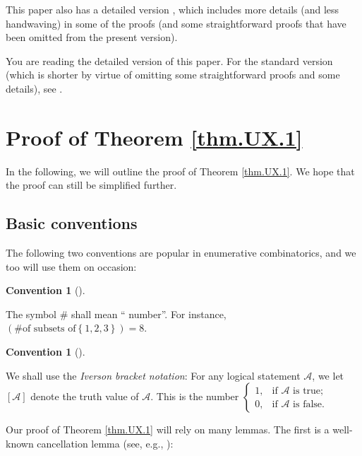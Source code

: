 \documentclass[numbers=enddot,12pt,final,onecolumn,notitlepage]{scrartcl}%
\numberwithin{exer}{section}
\theoremstyle{definition}
\newtheorem{conv}[theo]{Convention}
\newenvironment{convention}[1][]
{\begin{conv}[#1]\begin{leftbar}}
{\end{leftbar}\end{conv}}
\newenvironment{verlong}{}{}
\newenvironment{vershort}{}{}
\begin{document}
\begin{vershort}
This paper also has a detailed version \cite{verlong}, which includes more
details (and less handwaving) in some of the proofs (and some straightforward
proofs that have been omitted from the present version).
\end{vershort}

\begin{verlong}
You are reading the detailed version of this paper. For the standard version
(which is shorter by virtue of omitting some straightforward proofs and some
details), see \cite{vershort}.
\end{verlong}


\section{\label{sec.pf.thm.UX.1}Proof of Theorem \ref{thm.UX.1}}

In the following, we will outline the proof of Theorem \ref{thm.UX.1}. We hope
that the proof can still be simplified further.

\subsection{Basic conventions}

The following two conventions are popular in enumerative combinatorics, and we
too will use them on occasion:

\begin{convention}
\label{conv.number}The symbol \# shall mean \textquotedblleft
number\textquotedblright. For instance, $\left(  \text{\# of subsets of
}\left\{  1,2,3\right\}  \right)  =8$.
\end{convention}

\begin{convention}
\label{conv.iverson}We shall use the \emph{Iverson bracket notation}: For any
logical statement $\mathcal{A}$, we let $\left[  \mathcal{A}\right]  $ denote
the truth value of $\mathcal{A}$. This is the number $%
\begin{cases}
1, & \text{if }\mathcal{A}\text{ is true};\\
0, & \text{if }\mathcal{A}\text{ is false}.
\end{cases}
$
\end{convention}

Our proof of Theorem \ref{thm.UX.1} will rely on many lemmas. The first is a
well-known cancellation lemma (see, e.g., \cite[Proposition 7.8.10]{mps}):
\end{document}
